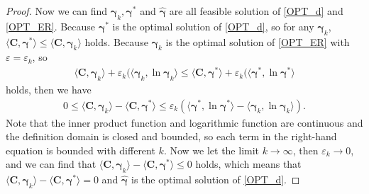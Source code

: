 \documentclass[review,hidelinks,onefignum,onetabnum]{siamart220329}
\begin{document}
\begin{proof}
 Now we can find $\bm{\gamma}_{k}, \bm{\gamma}^*$ and $\hat{\bm{\gamma}}$ are all feasible solution of \cref{OPT_d} and \cref{OPT_ER}. Because $\bm{\gamma}^*$ is the optimal solution of \cref{OPT_d}, so for any $\bm{\gamma}_k$, $\langle \bm{C}, \bm{\gamma}^*\rangle \leq \langle \bm{C}, \bm{\gamma}_k \rangle$ holds. 
 Because $\bm{\gamma}_k$ is the optimal solution of \cref{OPT_ER} with $\varepsilon=\varepsilon_k$, so 
 \begin{equation*}
     \begin{aligned}
     \langle \bm{C}, \bm{\gamma}_k\rangle +\varepsilon_k(\langle \bm{\gamma}_k, \ln \bm{\gamma}_k \rangle \leq \langle \bm{C}, \bm{\gamma}^* \rangle +\varepsilon_k(\langle \bm{\gamma}^*, \ln \bm{\gamma}^* \rangle
 \end{aligned}
 \end{equation*}
 holds,
 then we have
 \begin{equation*}
      \begin{aligned}
     0\leq \langle \bm{C}, \bm{\gamma}_k\rangle - \langle \bm{C}, \bm{\gamma}^* \rangle
     \leq \varepsilon_k(\langle \bm{\gamma}^*, \ln \bm{\gamma}^* \rangle-\langle \bm{\gamma}_k, \ln \bm{\gamma}_k \rangle ).
 \end{aligned}
 \end{equation*}
 Note that the inner product function and logarithmic function are continuous and the definition domain is closed and bounded, so each term in the right-hand equation is bounded with different $k$. 
 Now we let the limit $k\rightarrow \infty$, then $\varepsilon_k\rightarrow 0$, and we can find that $\langle \bm{C}, \bm{\gamma}_k\rangle - \langle \bm{C}, \bm{\gamma}^* \rangle \leq 0$ holds, which means that $\langle \bm{C}, \bm{\gamma}_k\rangle - \langle \bm{C}, \bm{\gamma}^* \rangle = 0$ and $\hat{\bm{\gamma}}$ is the optimal solution of \cref{OPT_d}.
\end{proof}
\end{document}
